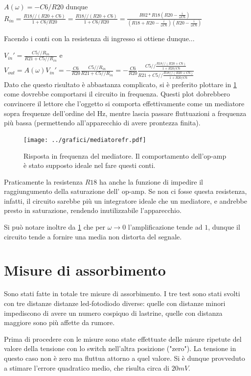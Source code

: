\documentclass[a4paper,10pt]{article}
\begin{document}
$A(\omega)=-C6/R20$ dunque $R_{in}=\frac{R18//(R20+C6)}{1+C6/R20}=\frac{R18//(R20+C6)}{1+C6/R20}=\frac{R02*R18(R20-\frac{i}{\omega C6})}{(R18+R20-\frac{i}{\omega C6})(R20-\frac{i}{\omega C6})}$

Facendo i conti con la resistenza di ingresso si ottiene dunque...

$V_{in}'=\frac{C5//R_{in}}{R21+C5//R_{in}}$ e $V_{out}=A(\omega)V_{in}'=-\frac{C6}{R20}\frac{C5//R_{in}}{R21+C5//R_{in}}=-\frac{C6}{R20}\frac{C5//\frac{R18//(R20+C6)}{1+R20/C6}}{R21+C5//\frac{R18//(R20+C6)}{1+R20/C6}}$\\


Dato che questo risultato è abbastanza complicato, si è preferito plottare in \cref{fig:MEDFR} come dovrebbe comportarsi il circuito in frequenza. Questi plot dobrebbero convincere il lettore che l'oggetto si comporta effettivamente come un mediatore sopra frequenze dell'ordine del Hz, mentre lascia passare fluttuazioni a frequenza più bassa (permettendo all'apparecchio di avere prontezza finita).

\begin{figure}[H]
	\centering
	\texttt{[image: ../grafici/mediatorefr.pdf]}
	\caption{Risposta in frequenza del mediatore. Il comportamento dell'op-amp è stato supposto ideale nel fare questi conti.}
	\label{fig:MEDFR}
\end{figure}

Praticamente la resistenza $R18$ ha anche la funzione di impedire il raggiungumento della saturazione dell' op-amp. Se non ci fosse questa resistenza, infatti, il circuito sarebbe più un integratore ideale che un mediatore, e andrebbe presto in saturazione, rendendo inutilizzabile l'apparecchio.


Si può notare inoltre da \cref{fig:MEDFR} che per $\omega \rightarrow 0$ l'amplificazione tende ad $1$, dunque il circuito tende a fornire una media non distorta del segnale.



\section{Misure di assorbimento}


Sono stati fatte in totale tre misure di assorbimento. I tre test sono stati svolti con tre distanze distanze led-fotodiodo diverse: quelle con distanze minori impediscono di avere un numero cospiquo di lastrine, quelle con distanza maggiore sono più affette da rumore. 


Prima di procedere con le misure sono state effettuate delle misure ripetute del valore della tensione con lo switch nell'altra posizione ("zero"). La tensione in questo caso non è zero ma fluttua attorno a quel valore. Si è dunque provveduto a stimare l'errore quadratico medio, che risulta circa di $20 mV$.
\end{document}
